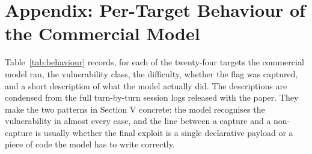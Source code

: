 \documentclass[conference]{IEEEtran}
\begin{document}
\section*{Appendix: Per-Target Behaviour of the Commercial Model}

Table~\ref{tab:behaviour} records, for each of the twenty-four targets the commercial model ran, the vulnerability class, the difficulty, whether the flag was captured, and a short description of what the model actually did. The descriptions are condensed from the full turn-by-turn session logs released with the paper. They make the two patterns in Section V concrete: the model recognises the vulnerability in almost every case, and the line between a capture and a non-capture is usually whether the final exploit is a single declarative payload or a piece of code the model has to write correctly.
\end{document}
